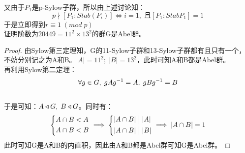 又由于$P_1$是p-Sylow子群，所以由上述讨论知：
\[
p\nmid [P_1:Stab(P_i)]\iff i=1,\;\text{且} [P_1:StabP_1]=1
\]
于是立即得到$r\equiv 1 \;(mod\; p)$\\
证明阶数为$20449=11^2\times 13^2$的群G是Abel群。
\begin{proof}
由Sylow第三定理知，G的11-Sylow子群和13-Sylow子群都有且只有一个，不妨分别记之为A和B。$|A|=11^2;\; |B|=13^2$，此时可知A和B都是Abel群。\\
再利用Sylow第二定理：
\[
\forall g\in G,\; gA{g}^{-1}=A,\; gB{g}^{-1}=B
\]
\\
于是可知：$A\triangleleft G,\; B\triangleleft G$。同时有：
\[
\left\{
\begin{aligned}
&A\cap B<A\\
&A\cap B<B
\end{aligned}\right.
\implies 
\left\{
\begin{aligned}
&|A\cap B|\bigm||A|\\
&|A\cap B|\bigm||B|
\end{aligned}\right.
\implies |A\cap B|=1
\]
此时可知G是A和B的内直积，因此由A和B都是Abel群可知G是Abel群。
\end{proof}




